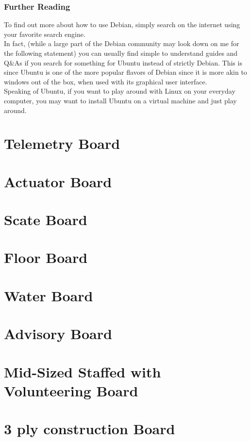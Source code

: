\documentclass[12pt,article]{memoir}
\begin{document}
\newpage
\subsection{Further Reading}
To find out more about how to use Debian, simply search on the internet using your favorite search engine.\\
In fact, (while a large part of the Debian community may look down on me for the following statement) you can usually find simple to understand guides and Q\&As if you search for something for Ubuntu instead of strictly Debian. This is since Ubuntu is one of the more popular flavors of Debian since it is more akin to windows out of the box, when used with its graphical user interface.\\
Speaking of Ubuntu, if you want to play around with Linux on your everyday computer, you may want to install Ubuntu on a virtual machine and just play around.


\newpage
\chapter{Telemetry Board}
\chapter{Actuator Board}
\chapter{Scate Board}
\chapter{Floor Board}
\chapter{Water Board}
\chapter{Advisory  Board}
\chapter{Mid-Sized Staffed with Volunteering Board}
\chapter{3 ply construction Board}

\end{document}
